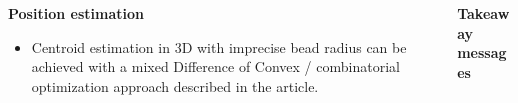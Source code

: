 \documentclass[final,svgnames,dvipsnames,table]{beamer}
\begin{document}
\begin{frame}[fragile]
\begin{columns}[t,totalwidth=\textwidth]
\begin{column}{0.32\textwidth}
\begin{minipage}{1\textwidth}
\begin{block}{\bf Position estimation}
\begin{itemize}
        \item Centroid estimation in 3D with imprecise bead radius can
          be achieved with a mixed Difference of Convex /
          combinatorial optimization approach described in the article.
      \end{itemize}
        \end{block}
        \end{minipage}

        
            \end{column}
    \begin{column}{0.32\textwidth}
      \hfill
            \begin{block}{\bf \color{red} Takeaway messages}
          \null\centering\relax


\end{block}
\end{column}
\end{columns}
\end{frame}
\end{document}
